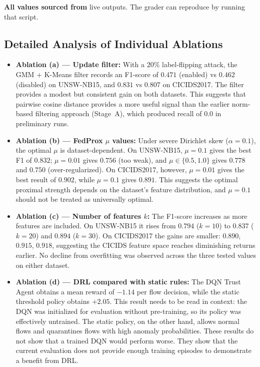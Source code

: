 \documentclass[11pt,a4paper]{article}
\begin{document}
\noindent\textbf{All values sourced from}  live outputs. The grader can reproduce by running that script.

\subsection{Detailed Analysis of Individual Ablations}
\begin{itemize}[leftmargin=1.6em,itemsep=2pt]
    \item \textbf{Ablation (a) --- Update filter:} With a $20\%$ label-flipping attack, the GMM + K-Means filter records an F1-score of $0.471$ (enabled) vs $0.462$ (disabled) on UNSW-NB15, and $0.831$ vs $0.807$ on CICIDS2017. The filter provides a modest but consistent gain on both datasets. This suggests that pairwise cosine distance provides a more useful signal than the earlier norm-based filtering approach (Stage~A), which produced recall of $0.0$ in preliminary runs.

    \item \textbf{Ablation (b) --- FedProx $\mu$ values:} Under severe Dirichlet skew ($\alpha=0.1$), the optimal $\mu$ is dataset-dependent. On UNSW-NB15, $\mu=0.1$ gives the best F1 of $0.832$; $\mu=0.01$ gives $0.756$ (too weak), and $\mu \in \{0.5, 1.0\}$ gives $0.778$ and $0.750$ (over-regularized). On CICIDS2017, however, $\mu=0.01$ gives the best result of $0.902$, while $\mu=0.1$ gives $0.891$. This suggests the optimal proximal strength depends on the dataset's feature distribution, and $\mu=0.1$ should not be treated as universally optimal.

    \item \textbf{Ablation (c) --- Number of features $k$:} The F1-score increases as more features are included. On UNSW-NB15 it rises from $0.794$ ($k=10$) to $0.837$ ($k=20$) and $0.894$ ($k=30$). On CICIDS2017 the gains are smaller: $0.890$, $0.915$, $0.918$, suggesting the CICIDS feature space reaches diminishing returns earlier. No decline from overfitting was observed across the three tested values on either dataset.

    \item \textbf{Ablation (d) --- DRL compared with static rules:} The DQN Trust Agent obtains a mean reward of $-1.14$ per flow decision, while the static threshold policy obtains $+2.05$. This result needs to be read in context: the DQN was initialized for evaluation without pre-training, so its policy was effectively untrained. The static policy, on the other hand, allows normal flows and quarantines flows with high anomaly probabilities. These results do not show that a trained DQN would perform worse. They show that the current evaluation does not provide enough training episodes to demonstrate a benefit from DRL.


\end{itemize}
\end{document}

